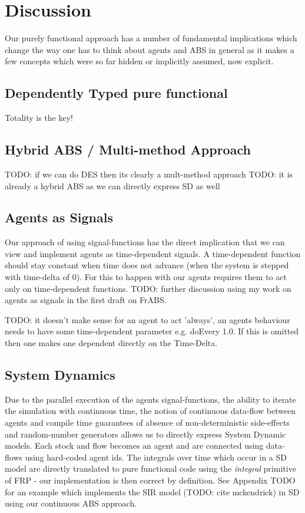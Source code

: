 \section{Discussion}
Our purely functional approach has a number of fundamental implications which change the way one has to think about agents and ABS in general as it makes a few concepts which were so far hidden or implicitly assumed, now explicit. 

\subsection{Dependently Typed pure functional}
Totality is the key!

\subsection{Hybrid ABS / Multi-method Approach}
TODO: if we can do DES then its clearly a mult-method approach
TODO: it is already a hybrid ABS as we can directly express SD as well

\subsection{Agents as Signals}
Our approach of using signal-functions has the direct implication that we can view and implement agents as time-dependent signals. A time-dependent function should stay constant when time does not advance (when the system is stepped with time-delta of 0). For this to happen with our agents requires them to act only on time-dependent functions. TODO: further discussion using my work on agents as signals in the first draft on FrABS.

TODO: it doesn't make sense for an agent to act 'always', an agents behaviour needs to have some time-dependent parameter e.g. doEvery 1.0. If this is omitted then one makes one dependent directly on the Time-Delta.

\subsection{System Dynamics}
Due to the parallel execution of the agents signal-functions, the ability to iterate the simulation with continuous time, the notion of continuous data-flow between agents and compile time guarantees of absence of non-deterministic side-effects and random-number generators allows us to directly express System Dynamic models.
Each stock and flow becomes an agent and are connected using data-flows using hard-coded agent ids. The integrals over time which occur in a SD model are directly translated to pure functional code using the \textit{integral} primitive of FRP - our implementation is then correct by definition.
See Appendix TODO for an example which implements the SIR model (TODO: cite mckendrick) in SD using our continuous ABS approach.

